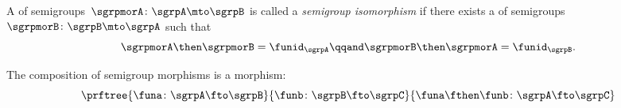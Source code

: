 \begin{ctdefinition}
  \label{def:semigroup-iso}
  A \whomo of semigroups~$\sgrpmorA\colon \sgrpA \mto \sgrpB$ is called a \emph{semigroup isomorphism} if there exists a \whomo of semigroups~$\sgrpmorB\colon \sgrpB \mto \sgrpA$ such that
  \begin{equation}
    \label{eq:sgrp-iso-cond}
    \sgrpmorA \then \sgrpmorB = \funid_\sgrpA  \qqand \sgrpmorB \then \sgrpmorA = \funid_\sgrpB.
  \end{equation}
\end{ctdefinition}

\begin{lemma}
  \label{lem:semigroup-morphisms-compose}
  The composition of semigroup morphisms is a morphism:
  \begin{equation}
    \label{eq:sgrp-mor-compo}
    \prftree{\funa  \colon \sgrpA \fto \sgrpB}{\funb \colon  \sgrpB \fto \sgrpC}{
      \funa \fthen \funb  \colon \sgrpA \fto \sgrpC}
  \end{equation}
\end{lemma}

